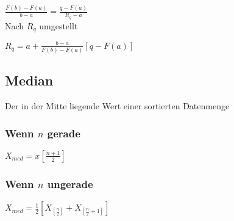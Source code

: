 \documentclass[../STS.tex]{subfiles}
\begin{document}
$
\frac{F(b) - F(a)}{b-a} = \frac{q - F(a)}{R_q - a}
$
\\
Nach $ R_q $ umgestellt

$
R_q = a + \frac{b-a}{F(b)-F(a)}[q - F(a)]
$

\subsection{Median}
Der in der Mitte liegende Wert einer sortierten Datenmenge

\subsubsection{Wenn $ n $ gerade}

$
X_{med} = x[\frac{n+1}{2}]
$

\subsubsection{Wenn $ n $ ungerade}

$
X_{med} =
\frac{1}{2} [X_{[\frac{n}{2}]} + X_{[\frac{n}{2} + 1]}]
$

	
\end{document}

